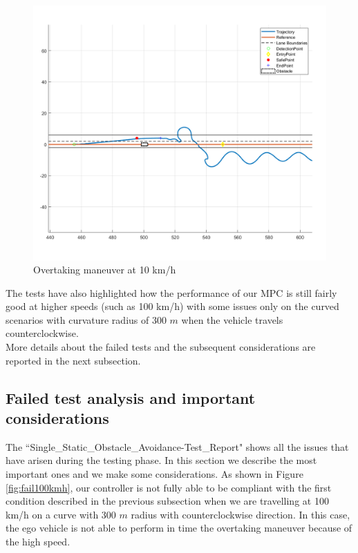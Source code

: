\begin{figure}[H]
    \centering
    \includegraphics[width=1\textwidth,keepaspectratio]{Figures/Failed10kmh.png}
    \caption{Overtaking maneuver at 10 km/h}
    \label{fig:overtaking_10}
\end{figure}




The tests have also highlighted how the performance of our MPC is still fairly good at higher speeds (such as 100 km/h) with some issues only on the curved scenarios with curvature radius of 300 $m$ when the vehicle travels counterclockwise. \\ 
More details about the failed tests and the subsequent considerations are reported in the next subsection.

\subsection{Failed test analysis and important considerations} \label{subsection:failed_tests}
The ``Single\_Static\_Obstacle\_Avoidance-Test\_Report" shows all the issues that have arisen during the testing phase. In this section we describe the most important ones and we make some considerations.
As shown in Figure \ref{fig:fail100kmh}, our controller is not fully able to be compliant with the first condition described in the previous subsection when we are travelling at 100 km/h on a curve with 300 $m$ radius with counterclockwise direction. In this case, the ego vehicle is not able to perform in time the overtaking maneuver because of the high speed. 

